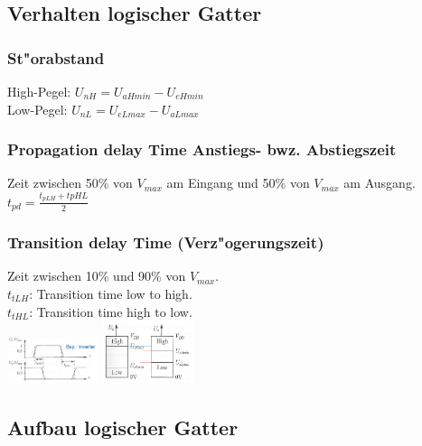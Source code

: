 	\subsection{Verhalten logischer Gatter}
		\begin{multicols}{2}
			\subsubsection{St"orabstand}
				High-Pegel: $ U_{nH} = U_{aHmin} - U_{eHmin} $\\
				Low-Pegel: $ U_{nL} = U_{eLmax} - U_{aLmax} $\\
				

			\subsubsection{Propagation delay Time Anstiegs- bwz. Abstiegszeit}
				Zeit zwischen 50\% von $V_{max}$ am Eingang und 50\% von $V_{max}$ am Ausgang.\\
				$t_{pd}=\frac{t_{pLH}+t{pHL}}{2}$\\
				
			\subsubsection{Transition delay Time (Verz"ogerungszeit)}
				Zeit zwischen 10\% und 90\% von $V_{max}$.\\
				$t_{tLH}$: Transition time low to high.\\
				$t_{tHL}$: Transition time high to low.\\
				\includegraphics[width=0.2\textwidth]{pics/delay}
				\includegraphics[width=0.2\textwidth]{pics/Pegelbereiche_Stoerabstand}
		\end{multicols}
		
		
\subsection{Aufbau logischer Gatter}

